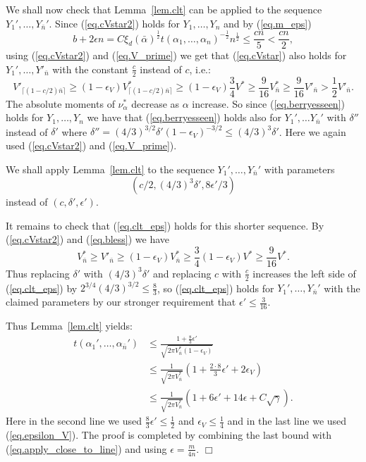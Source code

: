\documentclass{article}
\newenvironment{proofof}[1]{\noindent {\bf Proof of #1}}{\hspace*{\fill}$\Box$}
\begin{document}
\begin{proofof}{Theorem~\ref{thm.main}}
    We shall now check that Lemma~\ref{lem.clt} can be applied to the
sequence $Y_1', \dots, Y_{\bar n}'$.
Since (\ref{eq.cVstar2}) holds for $Y_1, \dots, Y_n$ and by (\ref{eq.m_eps})
\begin{equation}\label{eq.bless}
        b + 2\epsilon n = C \xi_d(\bar{\alpha})^{\frac 1 2} t(\alpha_1, \dots, \alpha_n)^{- \frac 1 2} n^{\frac 1 2}
        \le \frac {c n} 5 < \frac {c n} 2,
    \end{equation}
using (\ref{eq.cVstar2}) and 
    (\ref{eq.V_prime})
    we get that (\ref{eq.cVstar}) also holds for $Y_1', \dots, Y'_{\bar{n}}$ with the constant $\frac c 2$ instead of $c$, i.e.:
    \[
        V'_{\lceil (1-c/2) \bar{n}\rceil} \ge (1-\epsilon_V) V^*_{\lceil (1-c/2) \bar{n}\rceil} \ge (1-\epsilon_V) \frac 3 4 V^* \ge \frac 9 {16} V^*_{\bar n} \ge \frac 9 {16} V'_{\bar n}  >  \frac 1 2 V'_{\bar{n}}. 
    \]
    The absolute moments of $\nu^*_\alpha$ decrease as $\alpha$ increase.
    So since (\ref{eq.berryesseen}) holds for $Y_1, \dots, Y_n$
    we have that (\ref{eq.berryesseen}) holds also 
for $Y_1', \dots Y_{\bar{n}}'$ with $\delta''$ instead of $\delta'$ where $\delta'' = (4/3)^{3/2} \delta' (1-\epsilon_V)^{-3/2} \le (4/3)^3 \delta'$. Here we again used (\ref{eq.cVstar2}) and (\ref{eq.V_prime}).



    We shall apply Lemma~\ref{lem.clt} to 
    the sequence
$Y_1', \dots, Y_{\bar n}'$
    with parameters 
    \[
(c/2, (4/3)^3 \delta', 8 \epsilon'/3)
    \]
    instead of $(c, \delta', \epsilon')$. 

    It remains to check that (\ref{eq.clt_eps}) holds for this shorter sequence. By (\ref{eq.cVstar2}) and (\ref{eq.bless}) we have
    \[
        V^*_{\bar n} \ge V'_{\bar n} \ge (1 - \epsilon_V) V_{\bar n}^* \ge \frac 3 4 (1-\epsilon_V) V^* \ge \frac 9 {16} V^*.
    \]
    Thus 
replacing $\delta'$ with $(4/3)^3 \delta'$ and replacing $c$ with $\frac c 2$ increases the left side of (\ref{eq.clt_eps}) by 
$2^{3/4}(4/3)^{3/2} \le \frac 8 3$,
    so (\ref{eq.clt_eps}) holds 
for 
$Y_1', \dots, Y_{\bar n}'$
with the claimed 
parameters by our stronger requirement that 
$\epsilon' \le \frac 3 {16}$.

Thus Lemma~\ref{lem.clt} yields:
    \begin{align*}
t(\alpha_1', \dots, \alpha_{\bar{n}}') &\le \frac {1 +  \frac 8 3   \epsilon'} {\sqrt {2 \pi V_{\bar{n}}^* (1 - \epsilon_V)}}
        \\ & \le \frac 1 {\sqrt{2 \pi V_{\bar{n}}^*}} (1 + \frac {2 \cdot 8} 3 \epsilon' + 2 \epsilon_V)
        \\ & \le \frac 1 {\sqrt{2 \pi V_{\bar{n}}^*}} (1 + 6 \epsilon' + 14 \epsilon + C \sqrt{\gamma}).
    \end{align*}  
    Here in the second line we used $\frac 8 3  \epsilon'\le \frac 1 2$ and $\epsilon_V \le \frac 1 4$ and in the last line we used  (\ref{eq.epsilon_V}). The proof is completed by combining the last bound with (\ref{eq.apply_close_to_line}) and using $\epsilon = \frac m {4n}$.
\end{proofof}
\end{document}
